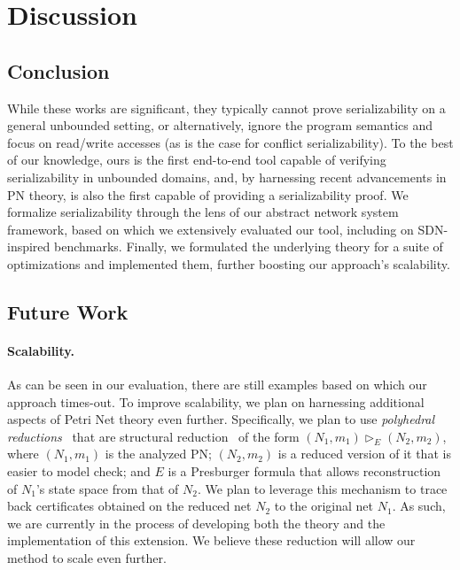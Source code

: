 \section{Discussion}
\label{sec:discussion}

\subsection{Conclusion}

While these works are significant, they typically cannot prove serializability on a general unbounded setting, or alternatively, ignore the program semantics and focus on read/write accesses (as is the case for conflict serializability).
%
To the best of our knowledge, ours is the first end-to-end
tool capable of verifying serializability in unbounded domains, and, by harnessing recent advancements in PN theory, is also the first  capable of providing a serializability proof.
%
We formalize serializability through the lens of our abstract network system framework, based on which we extensively evaluated our tool, including on SDN-inspired benchmarks. 
%
Finally, we formulated the underlying theory for a suite of optimizations and implemented them, further boosting our approach’s scalability.

%

\subsection{Future Work}

\paragraph{Scalability.}

As can be seen in our evaluation, there are still examples based on which our approach times-out.
To improve scalability, we plan on harnessing additional aspects of Petri Net theory even further.
%
Specifically, we plan to use \textit{polyhedral reductions}~\cite{AmBeDa21} that are structural reduction~\cite{Be87,BeLeDa20} of the form $(N_1, m_1) \vartriangleright_E (N_2, m_2)$, where $(N_1, m_1)$ is the analyzed PN;  $(N_2, m_2)$ is a reduced version of it that is easier to model check; and $E$ is a Presburger formula that allows reconstruction of $N_1$'s state space from that of $N_2$. We plan to leverage this mechanism to trace back certificates obtained on the reduced net $N_2$ to the original net $N_1$.
%
%
%
As such, we are currently in the process of developing both the theory and the implementation of this extension.
We believe these reduction will allow our method to scale even further.

